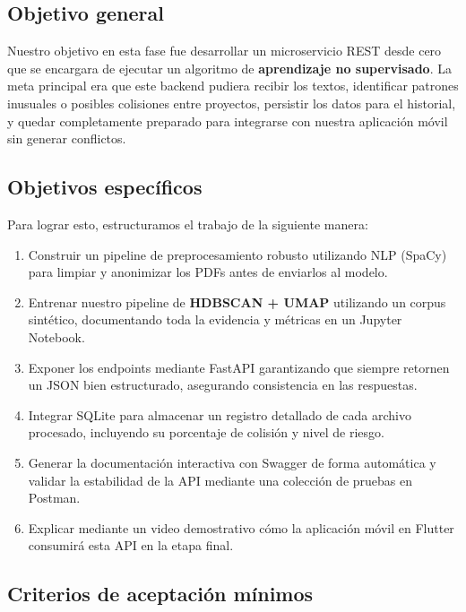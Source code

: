 

\subsection{Objetivo general}

Nuestro objetivo en esta fase fue desarrollar un microservicio REST desde cero que se encargara de ejecutar un algoritmo de \textbf{aprendizaje no supervisado}. La meta principal era que este backend pudiera recibir los textos, identificar patrones inusuales o posibles colisiones entre proyectos, persistir los datos para el historial, y quedar completamente preparado para integrarse con nuestra aplicación móvil sin generar conflictos.

\subsection{Objetivos específicos}

Para lograr esto, estructuramos el trabajo de la siguiente manera:

\begin{enumerate}
  \item Construir un pipeline de preprocesamiento robusto utilizando NLP (SpaCy) para limpiar y anonimizar los PDFs antes de enviarlos al modelo.
  \item Entrenar nuestro pipeline de \textbf{HDBSCAN + UMAP} utilizando un corpus sintético, documentando toda la evidencia y métricas en un Jupyter Notebook.
  \item Exponer los endpoints mediante FastAPI garantizando que siempre retornen un JSON bien estructurado, asegurando consistencia en las respuestas.
  \item Integrar SQLite para almacenar un registro detallado de cada archivo procesado, incluyendo su porcentaje de colisión y nivel de riesgo.
  \item Generar la documentación interactiva con Swagger de forma automática y validar la estabilidad de la API mediante una colección de pruebas en Postman.
  \item Explicar mediante un video demostrativo cómo la aplicación móvil en Flutter consumirá esta API en la etapa final.
\end{enumerate}

\subsection{Criterios de aceptación mínimos}

